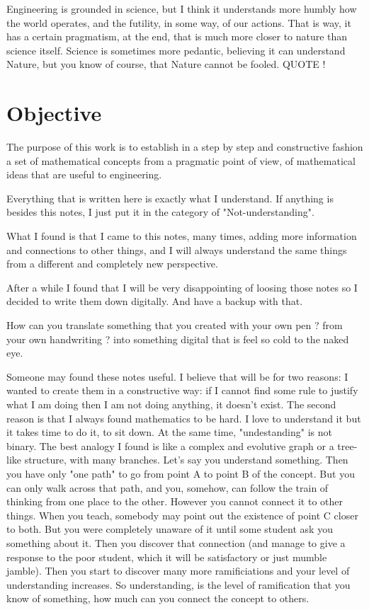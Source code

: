 \documentclass[11pt,fleqn]{book} %
\begin{document}
Engineering is grounded in science, but I think it understands more humbly how the world operates, and the futility, in some way, of our actions.  That is way, it has a certain pragmatism, at the end, that is much more closer to nature than science itself.  Science is sometimes more pedantic, believing it can understand Nature, but you know of course, that Nature cannot be fooled. QUOTE !


\section{Objective}

The purpose of this work is to establish in a step by step and constructive fashion a set of mathematical concepts from a pragmatic point of view, of mathematical ideas that are useful to engineering.

Everything that is written here is exactly what I understand. If anything is besides this notes, I just put it in the category of "Not-understanding".  

What I found is that I came to this notes, many times, adding more information and connections to other things, and I will always understand the same things from a different and completely new perspective.

After a while I found that I will be very disappointing of loosing those notes so I decided to write them down digitally. And have a backup with that.

How can you translate something that you created with your own pen ?  from your own handwriting ?  into something digital that is feel so cold to the naked eye.

Someone may found these notes useful.  I believe that will be for two reasons:  I wanted to create them in a constructive way: if I cannot find some rule to justify what I am doing then I am not doing anything, it doesn't exist.  The second reason is that I always found mathematics to be hard.  I love to understand it but it takes time to do it, to sit down.  At the same time, "undestanding" is not binary.  The best analogy I found is like a complex and evolutive graph or a tree-like structure, with many branches.  Let's say you understand something.  Then you have only "one path" to go from point A to point B of the concept.   But you can only walk across that path, and you, somehow, can follow the train of thinking from one place to the other.  However you cannot connect it to other things.  When you teach, somebody may point out the existence of point C closer to both.  But you were completely unaware of it until some student ask you something about it.  Then you discover that connection (and manage to give a response to the poor student, which it will be satisfactory or just mumble jamble).  Then you start to discover many more ramificiations and your level of understanding increases.  So understanding, is the level of ramification that you know of something, how much can you connect the concept to others.   
\end{document}
